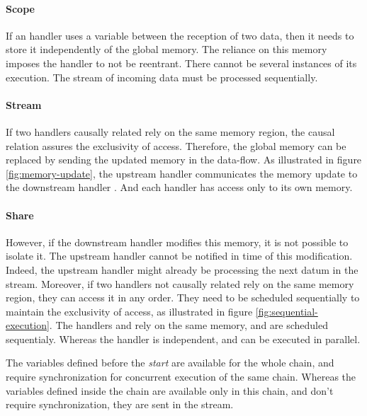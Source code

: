 \paragraph{Scope}
If an handler uses a variable between the reception of two data, then it needs to store it independently of the global memory.
The reliance on this memory imposes the handler to not be reentrant.
There cannot be several instances of its execution.
The stream of incoming data must be processed sequentially.

\paragraph{Stream}
If two handlers causally related rely on the same memory region, the causal relation assures the exclusivity of access. Therefore, the global memory can be replaced by sending the updated memory in the data-flow.
As illustrated in figure \ref{fig:memory-update}, the upstream handler  communicates the memory update to the downstream handler .
And each handler has access only to its own memory.

\paragraph{Share}
However, if the downstream handler modifies this memory, it is not possible to isolate it.
The upstream handler cannot be notified in time of this modification.
Indeed, the upstream handler might already be processing the next datum in the stream.
Moreover, if two handlers not causally related rely on the same memory region, they can access it in any order.
They need to be scheduled sequentially to maintain the exclusivity of access, as illustrated in figure \ref{fig:sequential-execution}.
The handlers  and  rely on the same memory, and are scheduled sequentialy.
Whereas the handler  is independent, and can be executed in parallel.

The variables defined before the \textit{start} are available for the whole chain, and require synchronization for concurrent execution of the same chain.
Whereas the variables defined inside the chain are available only in this chain, and don't require synchronization, they are sent in the stream.

